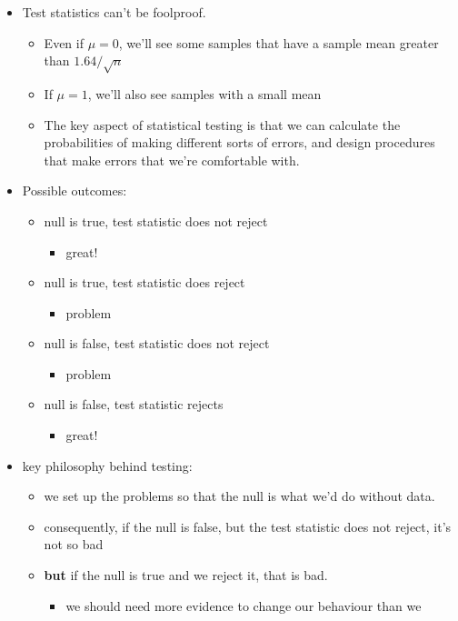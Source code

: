 \begin{itemize}
\item Test statistics can't be foolproof.
\begin{itemize}
\item Even if $μ = 0$, we'll see some samples that have a sample
         mean greater than $1.64 / \sqrt{n}$
\item If $μ = 1$, we'll also see samples with a small mean
\item The key aspect of statistical testing is that we can calculate
         the probabilities of making different sorts of errors, and
         design procedures that make errors that we're comfortable with.
\end{itemize}
\item Possible outcomes:
\begin{itemize}
\item null is true, test statistic does not reject
\begin{itemize}
\item great!
\end{itemize}
\item null is true, test statistic does reject
\begin{itemize}
\item problem
\end{itemize}
\item null is false, test statistic does not reject
\begin{itemize}
\item problem
\end{itemize}
\item null is false, test statistic rejects
\begin{itemize}
\item great!
\end{itemize}
\end{itemize}
\item key philosophy behind testing:
\begin{itemize}
\item we set up the problems so that the null is what we'd do
         without data.
\item consequently, if the null is false, but the test statistic
         does not reject, it's not so bad
\item \textbf{but} if the null is true and we reject it, that is bad.
\begin{itemize}
\item we should need more evidence to change our behaviour than we

\end{itemize}
\end{itemize}
\end{itemize}
